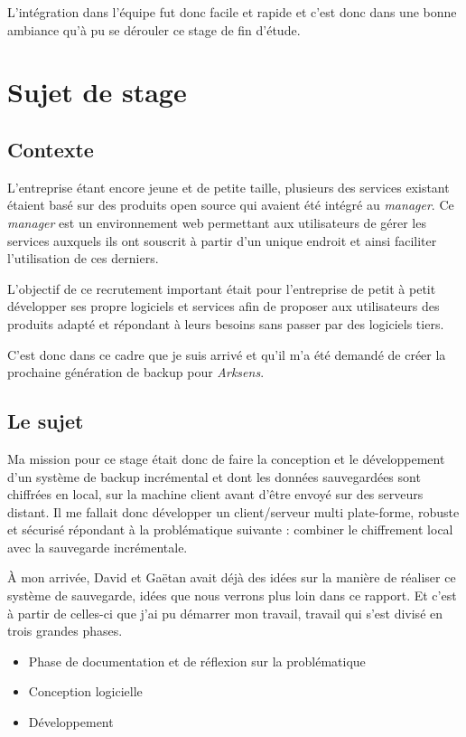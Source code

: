 \documentclass[a4paper,10pt, twoside]{report}
\begin{document}
\begin{spacing}{1.2}
L'int\'egration dans l'\'equipe fut donc facile et rapide et c'est donc dans
une bonne ambiance qu'\`a pu se d\'erouler ce stage de fin d'\'etude.

\section{Sujet de stage}
\subsection{Contexte}
L'entreprise \'etant encore jeune et de petite taille, plusieurs des services
existant \'etaient bas\'e sur des produits open source qui avaient \'et\'e
int\'egr\'e au \textit{manager}. Ce \textit{manager} est un environnement web
permettant aux utilisateurs de g\'erer les services auxquels ils ont souscrit
\`a partir d'un unique endroit et ainsi faciliter l'utilisation de ces derniers.

L'objectif de ce recrutement important \'etait pour l'entreprise de petit \`a
petit d\'evelopper ses propre logiciels et services afin de proposer aux
utilisateurs des produits adapt\'e et r\'epondant \`a leurs besoins sans passer
par des logiciels tiers.

C'est donc dans ce cadre que je suis arriv\'e et qu'il m'a \'et\'e demand\'e
de cr\'eer la prochaine g\'en\'eration de backup pour \textit{Arksens}.

\subsection{Le sujet}
Ma mission pour ce stage \'etait donc de faire la conception et le
d\'eveloppement d'un syst\`eme de backup incr\'emental et dont les donn\'ees
sauvegard\'ees sont chiffr\'ees en local, sur la machine client avant d'\^etre
envoy\'e sur des serveurs distant. Il me fallait donc d\'evelopper un
client/serveur multi plate-forme, robuste et s\'ecuris\'e r\'epondant \`a
la probl\'ematique suivante : combiner le chiffrement local avec la sauvegarde
incr\'ementale.

\`A mon arriv\'ee, David et Ga\"etan avait d\'ej\`a des id\'ees sur la
mani\`ere de r\'ealiser ce syst\`eme de sauvegarde, id\'ees que nous verrons
plus loin dans ce rapport. Et c'est \`a partir de celles-ci que j'ai pu
d\'emarrer mon travail, travail qui s'est divis\'e en trois grandes phases.

\begin{itemize}
 \item Phase de documentation et de r\'eflexion sur la probl\'ematique
 \item Conception logicielle
 \item D\'eveloppement
\end{itemize}


\end{spacing}
\end{document}

